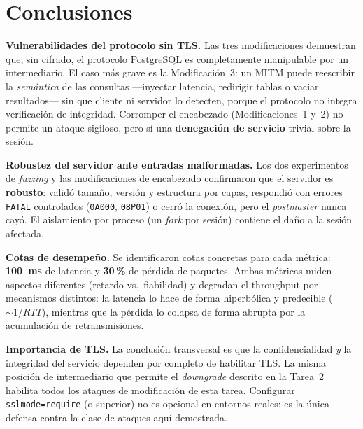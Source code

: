 \documentclass[11pt]{article}
\begin{document}
\section{Conclusiones}

\textbf{Vulnerabilidades del protocolo sin TLS.} Las tres modificaciones
demuestran que, sin cifrado, el protocolo PostgreSQL es completamente
manipulable por un intermediario. El caso más grave es la Modificación~3: un
MITM puede reescribir la \emph{semántica} de las consultas ---inyectar latencia,
redirigir tablas o vaciar resultados--- sin que cliente ni servidor lo detecten,
porque el protocolo no integra verificación de integridad. Corromper el
encabezado (Modificaciones~1 y~2) no permite un ataque sigiloso, pero sí una
\textbf{denegación de servicio} trivial sobre la sesión.

\textbf{Robustez del servidor ante entradas malformadas.} Los dos experimentos
de \emph{fuzzing} y las modificaciones de encabezado confirmaron que el servidor
es \textbf{robusto}: validó tamaño, versión y estructura por capas, respondió con
errores \texttt{FATAL} controlados (\texttt{0A000}, \texttt{08P01}) o cerró la
conexión, pero el \emph{postmaster} nunca cayó. El aislamiento por proceso (un
\emph{fork} por sesión) contiene el daño a la sesión afectada.

\textbf{Cotas de desempeño.} Se identificaron cotas concretas para cada métrica:
\textbf{100~ms} de latencia y \textbf{30\,\%} de pérdida de paquetes. Ambas métricas miden
aspectos diferentes (retardo vs.\ fiabilidad) y degradan el throughput por
mecanismos distintos: la latencia lo hace de forma hiperbólica y predecible
($\sim 1/RTT$), mientras que la pérdida lo colapsa de forma abrupta por la
acumulación de retransmisiones.

\textbf{Importancia de TLS.} La conclusión transversal es que la confidencialidad
\emph{y} la integridad del servicio dependen por completo de habilitar TLS. La
misma posición de intermediario que permite el \emph{downgrade} descrito en la
Tarea~2 habilita todos los ataques de modificación de esta tarea. Configurar
\texttt{sslmode=require} (o superior) no es opcional en entornos reales: es la
única defensa contra la clase de ataques aquí demostrada.
\end{document}
